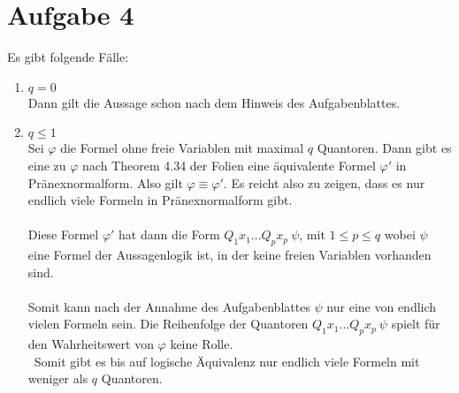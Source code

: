 \documentclass[a4paper,10pt]{article}
\begin{document}
\section*{Aufgabe 4}
Es gibt folgende Fälle:
\begin{enumerate}
\item{$q = 0$}\\
Dann gilt die Aussage schon nach dem Hinweis des Aufgabenblattes.
\item{$q \le 1$}\\
Sei $\varphi$ die Formel ohne freie Variablen mit maximal $q$ Quantoren. Dann gibt es eine zu $\varphi$ nach Theorem 4.34 der Folien eine äquivalente Formel $\varphi'$ in Pränexnormalform. Also gilt $\varphi \equiv \varphi'$. Es reicht also zu zeigen, dass es nur endlich viele Formeln in Pränexnormalform gibt.
\\\\
Diese Formel $\varphi'$ hat dann die Form $Q_1x_1...Q_px_p\ \psi$, mit $1 \le p \le q$ wobei $\psi$ eine Formel der Aussagenlogik ist, in der keine freien Variablen vorhanden sind. 
\\\\
Somit kann nach der Annahme des Aufgabenblattes $\psi$ nur eine von endlich vielen Formeln sein.  Die Reihenfolge der Quantoren $Q_1x_1...Q_px_p\ \psi$ spielt für den Wahrheitswert von $\varphi$ keine Rolle. 
\\\
Somit gibt es bis auf logische Äquivalenz nur endlich viele Formeln mit weniger als $q$ Quantoren.
\end{enumerate}
\end{document}
